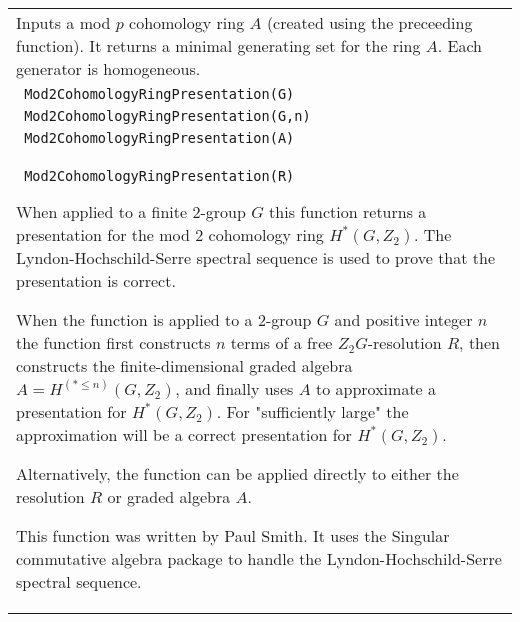 \documentclass[a4paper,11pt]{report}
\begin{document}
{\begin{center}
\begin{tabular}{|l|}
 Inputs a mod $p$ cohomology ring $A$ (created using the preceeding function). It returns a minimal generating set
for the ring $A$. Each generator is homogeneous. \\
 \texttt{ Mod2CohomologyRingPresentation(G) } \\
 \texttt{ Mod2CohomologyRingPresentation(G,n) } \\
 \texttt{ Mod2CohomologyRingPresentation(A) } \\
 \texttt{ Mod2CohomologyRingPresentation(R) } 

 When applied to a finite $2$-group $G$ this function returns a presentation for the mod 2 cohomology ring $H^*(G,Z_2)$. The Lyndon-Hochschild-Serre spectral sequence is used to prove that the
presentation is correct. 

 When the function is applied to a $2$-group $G$ and positive integer $n$ the function first constructs $n$ terms of a free $Z_2G$-resolution $R$, then constructs the finite-dimensional graded algebra $A=H^(*\le n)(G,Z_2)$, and finally uses $A$ to approximate a presentation for $H^*(G,Z_2)$. For "sufficiently large" the approximation will be a correct presentation
for $H^*(G,Z_2)$. 

 Alternatively, the function can be applied directly to either the resolution $R$ or graded algebra $A$. 

This function was written by Paul Smith. It uses the Singular commutative
algebra package to handle the Lyndon-Hochschild-Serre spectral sequence. \\
\end{tabular}\\[2mm]
\end{center}

 }

 
\end{document}
